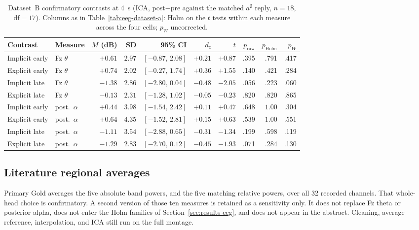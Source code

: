 \documentclass[english]{article}
\begin{document}
\begin{table}[H]
\centering
\small
\caption{Dataset~B confirmatory contrasts at 4~s (ICA, post$-$pre against the matched \(a^{\emptyset}\) reply,
\(n=18\), \(\mathrm{df}=17\)). Columns as in Table~\ref{tab:eeg-dataset-a}: Holm on the \(t\) tests within each measure
across the four cells; \(p_{W}\) uncorrected.}
\label{tab:eeg-dataset-b}
\setlength{\tabcolsep}{4pt}
\begin{tabular}{@{}ll rrr rr rrr@{}}
\toprule
Contrast & Measure & \(M\) (dB) & SD & 95\% CI & \(d_z\) & \(t\) & \(p_{\mathrm{raw}}\) & \(p_{\mathrm{Holm}}\) & \(p_{W}\) \\
\midrule
Implicit early & Fz \(\theta\) & $+0.61$ & $2.97$ & $[-0.87,\,2.08]$ & $+0.21$ & $+0.87$ & .395 & .791 & .417 \\
Explicit early & Fz \(\theta\) & $+0.74$ & $2.02$ & $[-0.27,\,1.74]$ & $+0.36$ & $+1.55$ & .140 & .421 & .284 \\
Implicit late & Fz \(\theta\) & $-1.38$ & $2.86$ & $[-2.80,\,0.04]$ & $-0.48$ & $-2.05$ & .056 & .223 & .060 \\
Explicit late & Fz \(\theta\) & $-0.13$ & $2.31$ & $[-1.28,\,1.02]$ & $-0.05$ & $-0.23$ & .820 & .820 & .865 \\
Implicit early & post.\ \(\alpha\) & $+0.44$ & $3.98$ & $[-1.54,\,2.42]$ & $+0.11$ & $+0.47$ & .648 & $1.00$ & .304 \\
Explicit early & post.\ \(\alpha\) & $+0.64$ & $4.35$ & $[-1.52,\,2.81]$ & $+0.15$ & $+0.63$ & .539 & $1.00$ & .551 \\
Implicit late & post.\ \(\alpha\) & $-1.11$ & $3.54$ & $[-2.88,\,0.65]$ & $-0.31$ & $-1.34$ & .199 & .598 & .119 \\
Explicit late & post.\ \(\alpha\) & $-1.29$ & $2.83$ & $[-2.70,\,0.12]$ & $-0.45$ & $-1.93$ & .071 & .284 & .130 \\
\bottomrule
\end{tabular}
\end{table}

\subsection{Literature regional averages}
\label{sec:app-eeg-channel-sets}

Primary Gold averages the five absolute band powers, and the five matching relative powers, over all 32 recorded channels. That whole-head choice is confirmatory. A second version of those ten measures is retained as a sensitivity only. It does not replace Fz theta or posterior alpha, does not enter the Holm families of Section~\ref{sec:results-eeg}, and does not appear in the abstract. Cleaning, average reference, interpolation, and ICA still run on the full montage.
\end{document}
